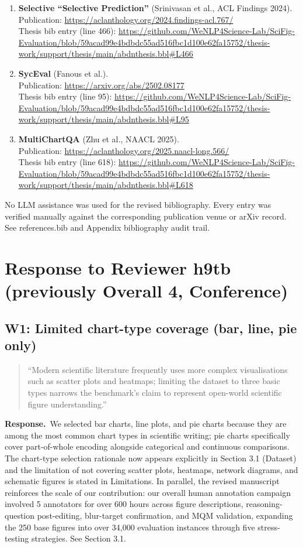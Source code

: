 \documentclass[11pt]{article}
\newcommand{\revsec}[1]{\textcolor{revisiongreen}{#1}}
\newenvironment{reviewercomment}{%
  \begin{quote}\small\itshape
}{%
  \end{quote}
}
\newcommand{\response}{\noindent\textbf{Response.}~}
\newcommand{\revisionitem}[3]{%
  \subsection{#1}
  \begin{reviewercomment}
  ``#2''
  \end{reviewercomment}
  \response #3\par
}
\begin{document}
{\begin{enumerate}[nosep,leftmargin=*]
\item \textbf{Selective ``Selective Prediction''} (Srinivasan et al., ACL Findings 2024).\\
Publication: \url{https://aclanthology.org/2024.findings-acl.767/}\\
Thesis bib entry (line 466): \url{https://github.com/WeNLP4Science-Lab/SciFig-Evaluation/blob/59acad99e4bdbdc55ad516fbc1d100e62fa15752/thesis-work/support/thesis/main/abdnthesis.bbl#L466}
\item \textbf{SycEval} (Fanous et al.).\\
Publication: \url{https://arxiv.org/abs/2502.08177}\\
Thesis bib entry (line 95): \url{https://github.com/WeNLP4Science-Lab/SciFig-Evaluation/blob/59acad99e4bdbdc55ad516fbc1d100e62fa15752/thesis-work/support/thesis/main/abdnthesis.bbl#L95}
\item \textbf{MultiChartQA} (Zhu et al., NAACL 2025).\\
Publication: \url{https://aclanthology.org/2025.naacl-long.566/}\\
Thesis bib entry (line 618): \url{https://github.com/WeNLP4Science-Lab/SciFig-Evaluation/blob/59acad99e4bdbdc55ad516fbc1d100e62fa15752/thesis-work/support/thesis/main/abdnthesis.bbl#L618}
\end{enumerate}
No LLM assistance was used for the revised bibliography. Every entry was verified manually against the corresponding publication venue or arXiv record. See \revsec{references.bib} and \revsec{Appendix bibliography audit trail}.}

\section{Response to Reviewer h9tb (previously Overall 4, Conference)}

\revisionitem
{W1: Limited chart-type coverage (bar, line, pie only)}
{Modern scientific literature frequently uses more complex visualisations such as scatter plots and heatmaps; limiting the dataset to three basic types narrows the benchmark's claim to represent open-world scientific figure understanding.}
{We selected bar charts, line plots, and pie charts because they are among the most common chart types in scientific writing; pie charts specifically cover part-of-whole encoding alongside categorical and continuous comparisons. The chart-type selection rationale now appears explicitly in \revsec{Section 3.1 (Dataset)} and the limitation of not covering scatter plots, heatmaps, network diagrams, and schematic figures is stated in \revsec{Limitations}. In parallel, the revised manuscript reinforces the scale of our contribution: our overall human annotation campaign involved 5 annotators for over 600 hours across figure descriptions, reasoning-question post-editing, blur-target confirmation, and MQM validation, expanding the 250 base figures into over 34{,}000 evaluation instances through five stress-testing strategies. See \revsec{Section 3.1}.}
\end{document}
